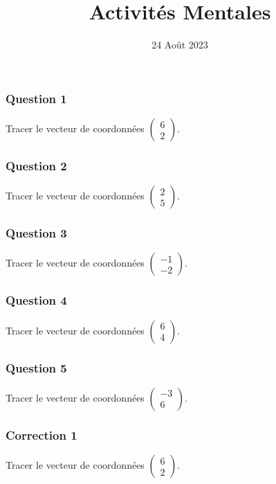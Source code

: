 \documentclass[15pt, mathserif]{beamer}
\title{Activités Mentales}
\date{24 Août 2023}
\begin{document}
\begin{frame}
    \titlepage
\end{frame}

\begin{frame} 
	\frametitle{Question 1}
Tracer le vecteur de coordonnées $\begin{pmatrix} 6\\ 2\end{pmatrix} $.\end{frame}


\begin{frame} 
	\frametitle{Question 2}
Tracer le vecteur de coordonnées $\begin{pmatrix} 2\\ 5\end{pmatrix} $.\end{frame}


\begin{frame} 
	\frametitle{Question 3}
Tracer le vecteur de coordonnées $\begin{pmatrix} -1\\ -2\end{pmatrix} $.\end{frame}


\begin{frame} 
	\frametitle{Question 4}
Tracer le vecteur de coordonnées $\begin{pmatrix} 6\\ 4\end{pmatrix} $.\end{frame}


\begin{frame} 
	\frametitle{Question 5}
Tracer le vecteur de coordonnées $\begin{pmatrix} -3\\ 6\end{pmatrix} $.\end{frame}


\begin{frame}
\vspace{-10mm}
	\frametitle{Correction 1}
\vspace*{1cm} 
 Tracer le vecteur de coordonnées $\begin{pmatrix} 6\\ 2\end{pmatrix} $.
 
 \vspace*{0.5cm}  \begin{center} 
 \end{center}\end{frame}
\end{document}
